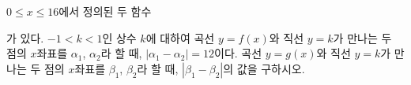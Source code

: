 $0\le x\le 16$에서 정의된 두 함수 \par\smallskip{}\par\smallskip\noindent 가 있다. $-1<k<1$인 상수 $k$에 대하여 곡선 \mbox{$y=f(x)$와} 직선 $y=k$가 만나는 두 점의 $x$좌표를 $\alpha_1$, $\alpha_2$라 할 때, $|\alpha_1-\alpha_2|=12$이다. 곡선 $y=g(x)$와 직선 $y=k$가 만나는 두 점의 $x$좌표를 $\beta_1$, $\beta_2$라 할 때, $|\beta_1-\beta_2|$의 값을 구하시오.
